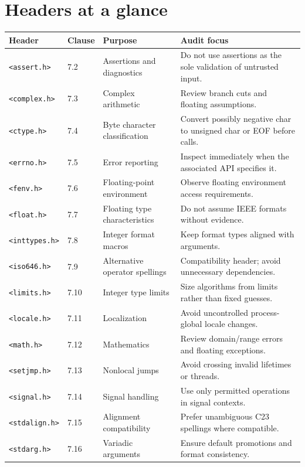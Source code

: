 \documentclass[10pt,letterpaper,oneside]{report}
\begin{document}
\section{Headers at a glance}
\scriptsize\begin{longtable}{p{.18\linewidth}p{.075\linewidth}p{.26\linewidth}p{.375\linewidth}}\toprule Header & Clause & Purpose & Audit focus\\\midrule\endhead
\texttt{<assert.h>} & 7.2 & Assertions and diagnostics & Do not use assertions as the sole validation of untrusted input.\\\hline
\texttt{<complex.h>} & 7.3 & Complex arithmetic & Review branch cuts and floating assumptions.\\\hline
\texttt{<ctype.h>} & 7.4 & Byte character classification & Convert possibly negative char to unsigned char or EOF before calls.\\\hline
\texttt{<errno.h>} & 7.5 & Error reporting & Inspect immediately when the associated API specifies it.\\\hline
\texttt{<fenv.h>} & 7.6 & Floating-point environment & Observe floating environment access requirements.\\\hline
\texttt{<float.h>} & 7.7 & Floating type characteristics & Do not assume IEEE formats without evidence.\\\hline
\texttt{<inttypes.h>} & 7.8 & Integer format macros & Keep format types aligned with arguments.\\\hline
\texttt{<iso646.h>} & 7.9 & Alternative operator spellings & Compatibility header; avoid unnecessary dependencies.\\\hline
\texttt{<limits.h>} & 7.10 & Integer type limits & Size algorithms from limits rather than fixed guesses.\\\hline
\texttt{<locale.h>} & 7.11 & Localization & Avoid uncontrolled process-global locale changes.\\\hline
\texttt{<math.h>} & 7.12 & Mathematics & Review domain/range errors and floating exceptions.\\\hline
\texttt{<setjmp.h>} & 7.13 & Nonlocal jumps & Avoid crossing invalid lifetimes or threads.\\\hline
\texttt{<signal.h>} & 7.14 & Signal handling & Use only permitted operations in signal contexts.\\\hline
\texttt{<stdalign.h>} & 7.15 & Alignment compatibility & Prefer unambiguous C23 spellings where compatible.\\\hline
\texttt{<stdarg.h>} & 7.16 & Variadic arguments & Ensure default promotions and format consistency.\\\hline

\end{longtable}
\end{document}
